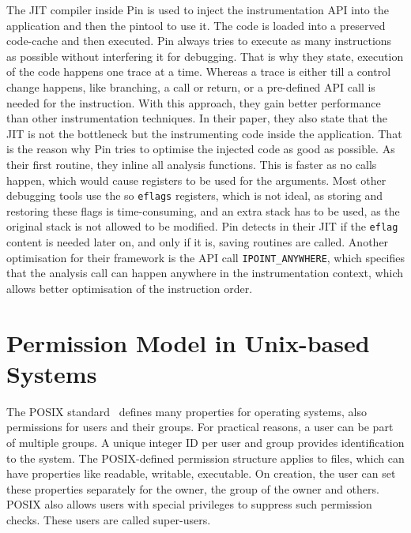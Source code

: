 The JIT compiler inside Pin is used to inject the instrumentation API into the
application and then the pintool to use it. The code is loaded into a preserved
code-cache and then executed. Pin always tries to execute as many instructions
as possible without interfering it for debugging. That is why they state,
execution of the code happens one trace at a time. Whereas a trace is either
till a control change happens, like branching, a call or return, or a
pre-defined API call is needed for the instruction. With this approach, they
gain better performance than other instrumentation techniques. In their paper,
they also state that the JIT is not the bottleneck but the instrumenting code
inside the application. That is the reason why Pin tries to optimise the
injected code as good as possible. As their first routine, they inline all
analysis functions. This is faster as no calls happen, which would cause
registers to be used for the arguments. Most other debugging tools use the so
\texttt{eflags} registers, which is not ideal, as storing and restoring these
flags is time-consuming, and an extra stack has to be used, as the original
stack is not allowed to be modified. Pin detects in their JIT if the
\texttt{eflag} content is needed later on, and only if it is, saving routines
are called. Another optimisation for their framework is the API call
\texttt{IPOINT\_ANYWHERE}, which specifies that the analysis call can happen
anywhere in the instrumentation context, which allows better optimisation of the
instruction order.

\section{Permission Model in Unix-based Systems}

The POSIX standard~\cite{posix} defines many properties for operating systems,
also permissions for users and their groups. For practical reasons, a user can
be part of multiple groups. A unique integer ID per user and group provides
identification to the system. The POSIX-defined permission structure applies to
files, which can have properties like readable, writable, executable. On
creation, the user can set these properties separately for the owner, the group
of the owner and others. POSIX also allows users with special privileges to
suppress such permission checks. These users are called super-users.

